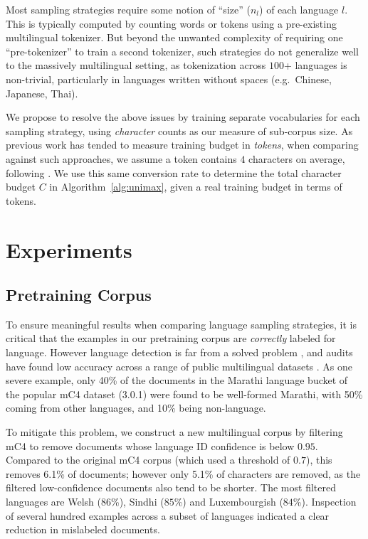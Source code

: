 \documentclass{article} %
\begin{document}
Most sampling strategies require some notion of ``size'' ($n_{l}$) of each language $l$. This is typically computed by counting words or tokens using a pre-existing multilingual tokenizer. But beyond the unwanted complexity of requiring one ``pre-tokenizer'' to train a second tokenizer, such strategies do not generalize well to the massively multilingual setting, as tokenization across $100$+ languages is non-trivial, particularly in languages written without spaces (e.g.~Chinese, Japanese, Thai).

We propose to resolve the above issues by training separate vocabularies for each sampling strategy, using \emph{character} counts as our measure of sub-corpus size. As previous work has tended to measure training budget in \emph{tokens}, when comparing against such approaches, we assume a token contains $4$ characters on average, following \citet{xue-etal-2022-byt5}. We use this same conversion rate to determine the total character budget $C$ in Algorithm~\ref{alg:unimax}, given a real training budget in terms of tokens.

\section{Experiments}
\label{sec:experiments}

\subsection{Pretraining Corpus} \label{sec:pretraining_corpus}

To ensure meaningful results when comparing language sampling strategies, it is critical that the examples in our pretraining corpus are \emph{correctly} labeled for language. However language detection is far from a solved problem \citep{caswell-etal-2020-language}, and audits have found low accuracy across a range of public multilingual datasets \citep{kreutzer-etal-2022-quality}. As one severe example, only 40\% of the documents in the Marathi language bucket of the popular mC4 dataset (3.0.1) were found to be well-formed Marathi, with 50\% coming from other languages, and 10\% being non-language.

To mitigate this problem, we construct a new multilingual corpus by filtering mC4 \citep{xue-etal-2021-mt5} to remove documents whose language ID confidence is below $0.95$. Compared to the original mC4 corpus (which used a threshold of $0.7$), this removes 6.1\% of documents; however only 5.1\% of characters are removed, as the filtered low-confidence documents also tend to be shorter. The most filtered languages are Welsh ($86$\%), Sindhi ($85$\%) and Luxembourgish ($84$\%). Inspection of several hundred examples across a subset of languages indicated a clear reduction in mislabeled documents.
\end{document}
